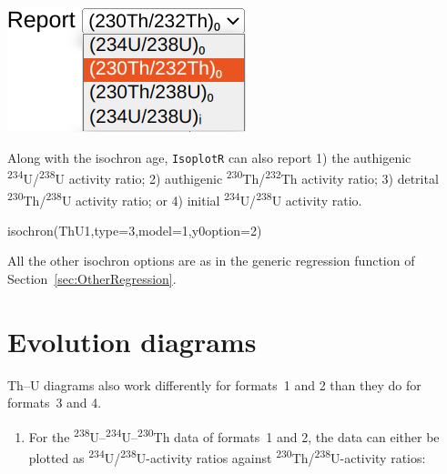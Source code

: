 \begin{refsection}
\noindent\begin{minipage}[t]{.25\linewidth}
\strut\vspace*{-\baselineskip}\newline
\includegraphics[width=\linewidth]{../figures/ThUy0.png}
\end{minipage}
\begin{minipage}[t]{.75\linewidth}
Along with the isochron age, \texttt{IsoplotR} can also report 1) the
authigenic \textsuperscript{234}U/\textsuperscript{238}U activity
ratio; 2) authigenic \textsuperscript{230}Th/\textsuperscript{232}Th
activity ratio; 3) detrital
\textsuperscript{230}Th/\textsuperscript{238}U activity ratio; or 4)
initial \textsuperscript{234}U/\textsuperscript{238}U activity ratio.
\end{minipage}

\begin{script}
isochron(ThU1,type=3,model=1,y0option=2)
\end{script}

All the other isochron options are as in the generic regression
function of Section~\ref{sec:OtherRegression}.

\section{Evolution diagrams}\label{sec:evolution}

Th--U diagrams also work differently for formats~1 and 2 than they do
for formats~3 and 4.

\begin{enumerate}

\item For the
  \textsuperscript{238}U--\textsuperscript{234}U--\textsuperscript{230}Th
  data of formats~1 and 2, the data can either be plotted as
  \textsuperscript{234}U/\textsuperscript{238}U-activity ratios
  against \textsuperscript{230}Th/\textsuperscript{238}U-activity
  ratios:


\end{enumerate}
\end{refsection}
